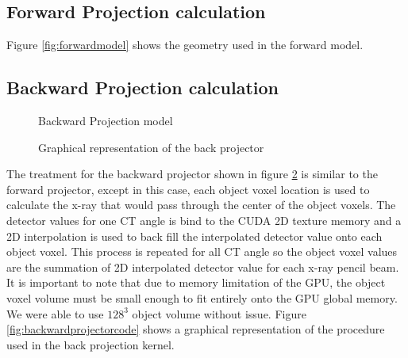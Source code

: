 \subsection{Forward Projection calculation}

Figure \ref{fig:forwardmodel} shows the geometry used in the forward model.

\begin{figure}[ht]
\centering
{}
\label{fig:forwardmodelcode}
\end{figure}


\subsection{Backward Projection calculation}

\begin{figure}[ht]
\centering
{}
\label{fig:backwardprojector}
\caption{Backward Projection model}
\end{figure}

\begin{figure}[ht]
\centering
{}
\label{fig:backprojectorcode}
\caption{Graphical representation of the back projector}
\end{figure}

The treatment for the backward projector shown in figure \ref{fig:backwardprojector} is similar to the forward projector, except in this case, each object voxel location is used to calculate the x-ray that would pass through the center of the object voxels.  The detector values for one CT angle is bind to the CUDA 2D texture memory and a 2D interpolation is used to back fill the interpolated detector value onto each object voxel.  This process is repeated for all CT angle so the object voxel values are the summation of 2D interpolated detector value for each x-ray pencil beam.  It is important to note that due to memory limitation of the GPU, the object voxel volume must be small enough to fit entirely onto the GPU global memory.  We were able to use $128^3$ object volume without issue.  Figure \ref{fig:backwardprojectorcode} shows a graphical representation of the procedure used in the back projection kernel.


